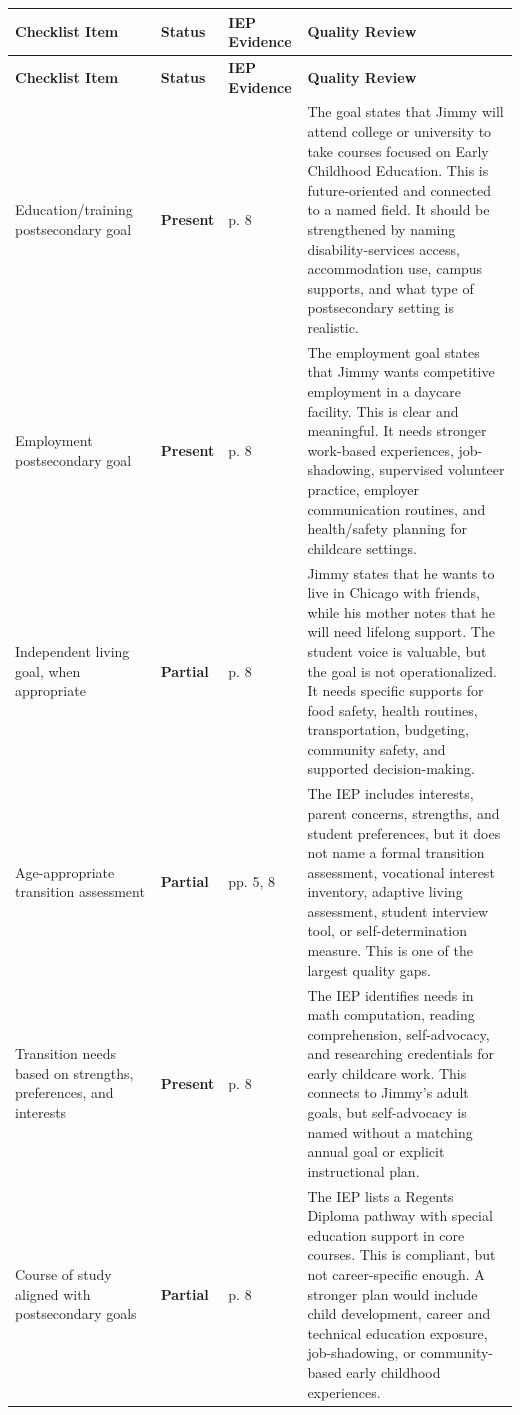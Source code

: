 \documentclass[11pt]{article}
\newcommand{\Present}{\textbf{\textcolor{PresentGreen}{Present}}}
\newcommand{\Partial}{\textbf{\textcolor{PartialOrange}{Partial}}}
\begin{document}
\footnotesize
{}
\begin{longtable}{L{0.19\textwidth} L{0.11\textwidth} L{0.11\textwidth} L{0.50\textwidth}}
\toprule
\textbf{Checklist Item} & \textbf{Status} & \textbf{IEP Evidence} & \textbf{Quality Review} \\
\midrule
\endfirsthead
\toprule
\textbf{Checklist Item} & \textbf{Status} & \textbf{IEP Evidence} & \textbf{Quality Review} \\
\midrule
\endhead
Education/training postsecondary goal & \Present & p. 8 & The goal states that Jimmy will attend college or university to take courses focused on Early Childhood Education. This is future-oriented and connected to a named field. It should be strengthened by naming disability-services access, accommodation use, campus supports, and what type of postsecondary setting is realistic. \\
Employment postsecondary goal & \Present & p. 8 & The employment goal states that Jimmy wants competitive employment in a daycare facility. This is clear and meaningful. It needs stronger work-based experiences, job-shadowing, supervised volunteer practice, employer communication routines, and health/safety planning for childcare settings. \\
Independent living goal, when appropriate & \Partial & p. 8 & Jimmy states that he wants to live in Chicago with friends, while his mother notes that he will need lifelong support. The student voice is valuable, but the goal is not operationalized. It needs specific supports for food safety, health routines, transportation, budgeting, community safety, and supported decision-making. \\
Age-appropriate transition assessment & \Partial & pp. 5, 8 & The IEP includes interests, parent concerns, strengths, and student preferences, but it does not name a formal transition assessment, vocational interest inventory, adaptive living assessment, student interview tool, or self-determination measure. This is one of the largest quality gaps. \\
Transition needs based on strengths, preferences, and interests & \Present & p. 8 & The IEP identifies needs in math computation, reading comprehension, self-advocacy, and researching credentials for early childcare work. This connects to Jimmy's adult goals, but self-advocacy is named without a matching annual goal or explicit instructional plan. \\
Course of study aligned with postsecondary goals & \Partial & p. 8 & The IEP lists a Regents Diploma pathway with special education support in core courses. This is compliant, but not career-specific enough. A stronger plan would include child development, career and technical education exposure, job-shadowing, or community-based early childhood experiences. \\

\end{longtable}
\end{document}
